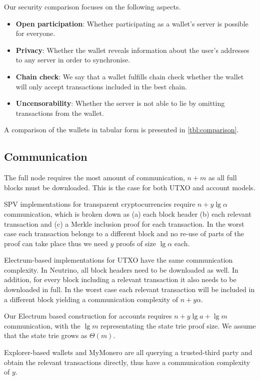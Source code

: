 Our security comparison focuses on the following aspects.
\begin{itemize}
    \item \textbf{Open participation}: Whether participating as a wallet's server is possible for everyone.
    \item \textbf{Privacy}: Whether the wallet reveals information about the user's addresses to any server in order to synchronise.
    \item \textbf{Chain check}: We say that a wallet fulfills chain check whether the wallet will only accept transactions included in the best chain.
    \item \textbf{Uncensorability}: Whether the server is not able to lie by omitting transactions from the wallet.
\end{itemize}

A comparison of the wallets in tabular form is presented in \cref{tbl:comparison}.

\subsection{Communication}
The full node requires the most amount of communication, $n+m$ as all full blocks must be downloaded. This is the case for both UTXO and account models.

SPV implementations for transparent cryptocurrencies require $n+y\lg{\alpha}$ communication, which is broken down as (a) each block header (b) each relevant transaction and (c) a Merkle inclusion proof for each transaction. In the worst case each transaction belongs to a different block and no re-use of parts of the proof can take place thus we need $y$ proofs of size $\lg{\alpha}$ each.

Electrum-based implementations for UTXO have the same communication complexity. In Neutrino, all block headers need to be downloaded as well. In addition, for every block including a relevant transaction it also needs to be downloaded in full. In the worst case each relevant transaction will be included in a different block yielding a communication complexity of $n+y\alpha$.

Our Electrum based construction for accounts requires $n+y\lg{a}+\lg{m}$ communication, with the $\lg{m}$ representating the state trie proof size. We assume that the state trie grows as $\Theta(m)$.

Explorer-based wallets and MyMonero are all querying a trusted-third party and obtain the relevant transactions directly, thus have a communication complexity of $y$.

